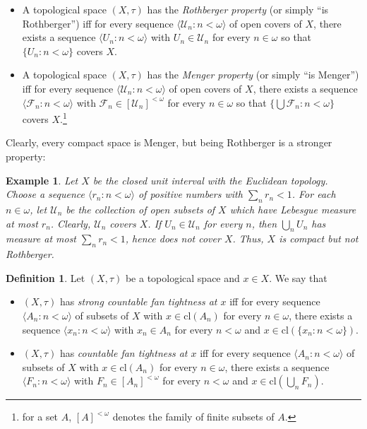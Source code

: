 \documentclass{amsart}
\newtheorem{example}[theorem]{Example}
\theoremstyle{definition}
\newtheorem{definition}[theorem]{Definition}
\newcommand{\U}{\mathcal{U}}
\newcommand{\cl}{\mathrm{cl}}
\newcommand{\F}{\mathcal{F}}
\newcommand{\w}{\omega}
\newcommand{\seq}[1]{{\langle{#1}\rangle}}
\begin{document}
\begin{itemize}
\item A topological space $(X,\tau)$ has the \emph{Rothberger property} (or simply ``is Rothberger'') iff for every sequence $\seq{\U_n:n<\omega}$ of open covers of $X$, there exists a sequence $\seq{U_n:n<\omega}$ with $U_n\in\U_n$ for every $n\in\omega$ so that $\{U_n:n<\omega\}$ covers $X$.
\item A topological space $(X,\tau)$ has the \emph{Menger property} (or simply ``is Menger'') iff for every sequence $\seq{\U_n:n<\omega}$ of open covers of $X$, there exists a sequence $\seq{\mathcal{F}_n:n<\omega}$ with $\mathcal{F}_n\in [\U_n]^{<\omega}$ for every $n\in\omega$ so that $\{\bigcup\F_n:n<\omega\}$ covers $X$.\footnote{for a set $A$, $[A]^{<\omega}$ denotes the family of finite subsets of $A$.}
\end{itemize}

Clearly, every compact space is Menger, but being Rothberger is a stronger property:

\begin{example}
Let $X$ be the closed unit interval with the Euclidean topology. Choose a sequence $\seq{r_n:n<\omega}$ of positive numbers with $\sum_n r_n<1$. For each $n\in\omega$, let $\U_n$ be the collection of open subsets of $X$ which have Lebesgue measure at most $r_n$. Clearly, $\U_n$ covers $X$. If $U_n\in\U_n$ for every $n$, then $\bigcup_n U_n$ has measure at most $\sum_n r_n<1$, hence does not cover $X$.
Thus, $X$ is compact but not Rothberger.
\end{example}

\begin{definition}\label{fan}
Let $(X,\tau)$ be a topological space and $x\in X$. We say that
\begin{itemize}
\item $(X,\tau)$ has \emph{strong countable fan tightness at $x$} iff for every sequence $\seq{A_n:n<\omega}$ of subsets of $X$ with $x\in\cl(A_n)$ for every $n\in\omega$, there exists a sequence $\seq{x_n:n<\omega}$ with $x_n\in A_n$ for every $n<\omega$ and $x\in \cl(\{x_n:n<\omega\})$.
\item $(X,\tau)$ has \emph{countable fan tightness at $x$} iff for every sequence $\seq{A_n:n<\omega}$ of subsets of $X$ with $x\in\cl(A_n)$ for every $n\in\omega$, there exists a sequence $\seq{F_n:n<\omega}$ with $F_n\in [A_n]^{<\w}$ for every $n<\omega$ and $x\in \cl(\bigcup_n F_n)$.
\end{itemize}
\end{definition}
\end{document}
